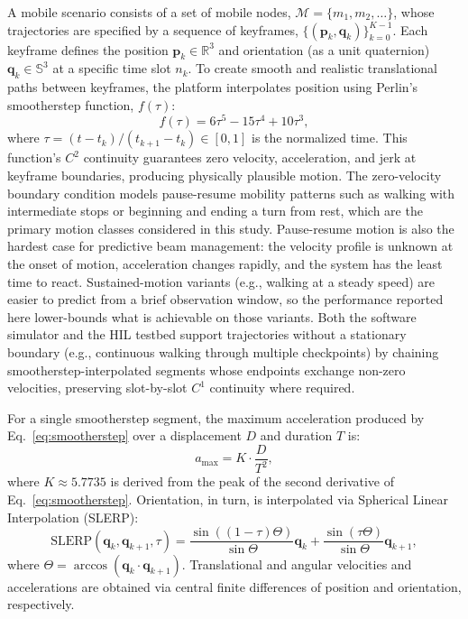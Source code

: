 \documentclass[fleqn,10pt]{wlscirep}
\newcommand{\rev}[1]{#1}
\begin{document}
A mobile scenario consists of a set of mobile nodes, $\mathcal{M} = \{m_1, m_2, \dots\}$, whose trajectories are specified by a sequence of keyframes, $\{(\mathbf{p}_k, \mathbf{q}_k)\}_{k=0}^{K-1}$. Each keyframe defines the position $\mathbf{p}_k \in \mathbb{R}^3$ and orientation (as a unit quaternion) $\mathbf{q}_k \in \mathbb{S}^3$ at a specific time slot $n_k$. To create smooth and realistic translational paths between keyframes, the platform interpolates position using Perlin's smootherstep function\cite{Perlin2002}, $f(\tau)$:
\begin{equation}
f(\tau) = 6\tau^5 - 15\tau^4 + 10\tau^3,
\label{eq:smootherstep}
\end{equation}
where $\tau = (t - t_k) / (t_{k+1} - t_k) \in [0, 1]$ is the normalized time. This function's $C^2$ continuity guarantees zero velocity, acceleration, and jerk at keyframe boundaries, producing physically plausible motion. \rev{The zero-velocity boundary condition models pause-resume mobility patterns such as walking with intermediate stops or beginning and ending a turn from rest, which are the primary motion classes considered in this study. Pause-resume motion is also the hardest case for predictive beam management: the velocity profile is unknown at the onset of motion, acceleration changes rapidly, and the system has the least time to react. Sustained-motion variants (e.g., walking at a steady speed) are easier to predict from a brief observation window, so the performance reported here lower-bounds what is achievable on those variants. Both the software simulator and the HIL testbed support trajectories without a stationary boundary (e.g., continuous walking through multiple checkpoints) by chaining smootherstep-interpolated segments whose endpoints exchange non-zero velocities, preserving slot-by-slot $C^1$ continuity where required.}

For a single smootherstep segment, the maximum acceleration produced by Eq.~\eqref{eq:smootherstep} over a displacement $D$ and duration $T$ is:
\begin{equation}
    a_{\max} = K \cdot \frac{D}{T^2},
\end{equation}
where $K \approx 5.7735$ is derived from the peak of the second derivative of Eq.~\eqref{eq:smootherstep}. Orientation, in turn, is interpolated via Spherical Linear Interpolation (SLERP)\cite{Shoemake1985SLERP}:
\begin{equation}
    \text{SLERP}(\mathbf{q}_k, \mathbf{q}_{k+1}, \tau) = \frac{\sin((1-\tau)\Theta)}{\sin\Theta}\mathbf{q}_k + \frac{\sin(\tau\Theta)}{\sin\Theta}\mathbf{q}_{k+1},
\end{equation}
where $\Theta = \arccos(\mathbf{q}_k \cdot \mathbf{q}_{k+1})$. Translational and angular velocities and accelerations are obtained via central finite differences of position and orientation, respectively.
\end{document}
